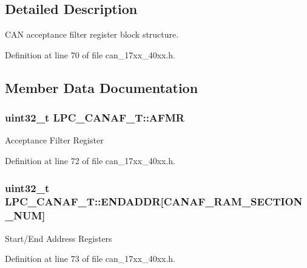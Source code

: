 \subsection{Detailed Description}
C\+AN acceptance filter register block structure. 

Definition at line 70 of file can\+\_\+17xx\+\_\+40xx.\+h.



\subsection{Member Data Documentation}
\subsubsection[{\texorpdfstring{A\+F\+MR}{AFMR}}]{ uint32\+\_\+t L\+P\+C\+\_\+\+C\+A\+N\+A\+F\+\_\+\+T\+::\+A\+F\+MR}\hypertarget{structLPC__CANAF__T_a987f2996cd4432665a2cbde52251f429}{}\label{structLPC__CANAF__T_a987f2996cd4432665a2cbde52251f429}
Acceptance Filter Register 

Definition at line 72 of file can\+\_\+17xx\+\_\+40xx.\+h.

\subsubsection[{\texorpdfstring{E\+N\+D\+A\+D\+DR}{ENDADDR}}]{ uint32\+\_\+t L\+P\+C\+\_\+\+C\+A\+N\+A\+F\+\_\+\+T\+::\+E\+N\+D\+A\+D\+DR\mbox{[}{\bf C\+A\+N\+A\+F\+\_\+\+R\+A\+M\+\_\+\+S\+E\+C\+T\+I\+O\+N\+\_\+\+N\+UM}\mbox{]}}\hypertarget{structLPC__CANAF__T_ab62d75d561c2446b4ac8ce383e566498}{}\label{structLPC__CANAF__T_ab62d75d561c2446b4ac8ce383e566498}
Start/\+End Address Registers 

Definition at line 73 of file can\+\_\+17xx\+\_\+40xx.\+h.

